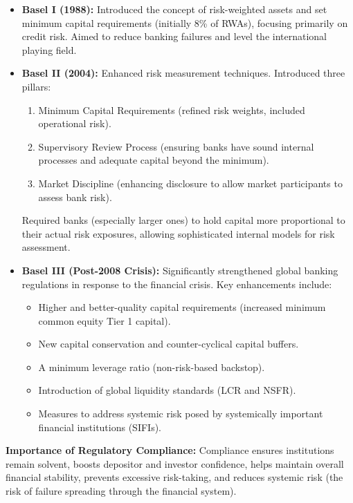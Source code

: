 \begin{itemize}
    \item \textbf{Basel I (1988):} Introduced the concept of risk-weighted assets and set minimum capital requirements (initially 8\% of RWAs), focusing primarily on credit risk. Aimed to reduce banking failures and level the international playing field.
    \item \textbf{Basel II (2004):} Enhanced risk measurement techniques. Introduced three pillars:
        \begin{enumerate}
            \item Minimum Capital Requirements (refined risk weights, included operational risk).
            \item Supervisory Review Process (ensuring banks have sound internal processes and adequate capital beyond the minimum).
            \item Market Discipline (enhancing disclosure to allow market participants to assess bank risk).
        \end{enumerate}
        Required banks (especially larger ones) to hold capital more proportional to their actual risk exposures, allowing sophisticated internal models for risk assessment.
    \item \textbf{Basel III (Post-2008 Crisis):} Significantly strengthened global banking regulations in response to the financial crisis. Key enhancements include:
        \begin{itemize}
            \item Higher and better-quality capital requirements (increased minimum common equity Tier 1 capital).
            \item New capital conservation and counter-cyclical capital buffers.
            \item A minimum leverage ratio (non-risk-based backstop).
            \item Introduction of global liquidity standards (LCR and NSFR).
            \item Measures to address systemic risk posed by systemically important financial institutions (SIFIs).
        \end{itemize}
\end{itemize}
\textbf{Importance of Regulatory Compliance:} Compliance ensures institutions remain solvent, boosts depositor and investor confidence, helps maintain overall financial stability, prevents excessive risk-taking, and reduces systemic risk (the risk of failure spreading through the financial system).

